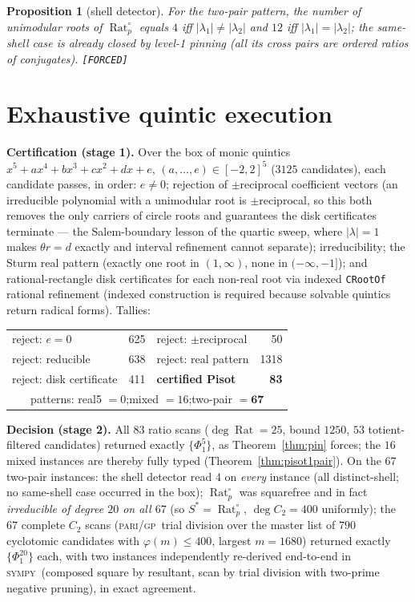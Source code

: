 \documentclass[11pt]{article}
\newcommand{\F}{\textnormal{\texttt{[FORCED]}}}
\newcommand{\Rat}{\operatorname{Rat}}
\newcommand{\gp}{\textsc{pari/gp}}
\newcommand{\sy}{\textsc{sympy}}
\newtheorem{proposition}[theorem]{Proposition}
\theoremstyle{definition}
\begin{document}
\begin{proposition}[shell detector]\label{prop:shells}
For the two-pair pattern, the number of unimodular roots of $\Rat_p^{\circ}$
equals $4$ iff $|\lambda_1|\neq|\lambda_2|$ and $12$ iff
$|\lambda_1|=|\lambda_2|$; the same-shell case is already closed by level-1
pinning (all its cross pairs are ordered ratios of conjugates). \F
\end{proposition}

\section{Exhaustive quintic execution}\label{sec:quintic}

\textbf{Certification (stage 1).} Over the box of monic quintics
$x^5+ax^4+bx^3+cx^2+dx+e$, $(a,\dots,e)\in[-2,2]^5$ ($3125$ candidates), each
candidate passes, in order: $e\neq0$; rejection of $\pm$reciprocal coefficient
vectors (an irreducible polynomial with a unimodular root is $\pm$reciprocal,
so this both removes the only carriers of circle roots and guarantees the disk
certificates terminate --- the Salem-boundary lesson of the quartic sweep, where
$|\lambda|=1$ makes $\theta r=d$ exactly and interval refinement cannot
separate); irreducibility; the Sturm real pattern (exactly one root in
$(1,\infty)$, none in $(-\infty,-1]$); and rational-rectangle disk certificates
for each non-real root via indexed \texttt{CRootOf} rational refinement
(indexed construction is required because solvable quintics return radical
forms). Tallies:

\begin{center}
\begin{tabular}{lrlr}
\hline
reject: $e=0$ & 625 & reject: $\pm$reciprocal & 50\\
reject: reducible & 638 & reject: real pattern & 1318\\
reject: disk certificate & 411 & \textbf{certified Pisot} & \textbf{83}\\
\hline
\multicolumn{4}{c}{patterns: real5 $=0$;\quad mixed $=16$;\quad two-pair $=\mathbf{67}$}\\
\hline
\end{tabular}
\end{center}

\textbf{Decision (stage 2).} All $83$ ratio scans ($\deg\Rat=25$, bound $1250$,
$53$ totient-filtered candidates) returned exactly $\{\Phi_1^5\}$, as
Theorem~\ref{thm:pin} forces; the $16$ mixed instances are thereby fully typed
(Theorem~\ref{thm:pisot1pair}). On the $67$ two-pair instances: the shell
detector read $4$ on \emph{every} instance (all distinct-shell; no same-shell
case occurred in the box); $\Rat_p^{\circ}$ was squarefree and in fact
\emph{irreducible of degree $20$ on all $67$} (so $S^{*}=\Rat_p^{\circ}$,
$\deg C_2=400$ uniformly); the $67$ complete $C_2$ scans (\gp\ trial division
over the master list of $790$ cyclotomic candidates with
$\varphi(m)\le400$, largest $m=1680$) returned exactly $\{\Phi_1^{20}\}$ each,
with two instances independently re-derived end-to-end in \sy\ (composed square
by resultant, scan by trial division with two-prime negative pruning), in exact
agreement.
\end{document}
